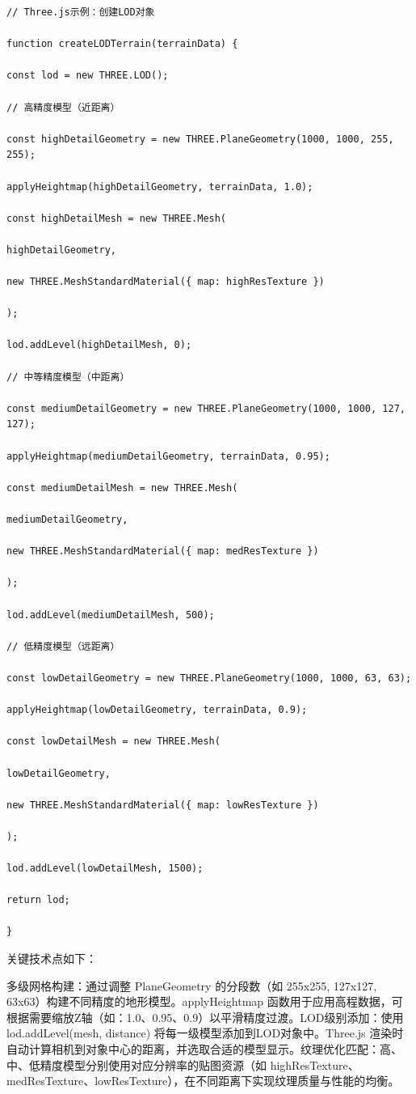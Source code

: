 \begin{lstlisting}[style=javascript]
// Three.js示例：创建LOD对象

function createLODTerrain(terrainData) {

const lod = new THREE.LOD();

// 高精度模型（近距离）

const highDetailGeometry = new THREE.PlaneGeometry(1000, 1000, 255, 255);

applyHeightmap(highDetailGeometry, terrainData, 1.0);

const highDetailMesh = new THREE.Mesh(

highDetailGeometry,

new THREE.MeshStandardMaterial({ map: highResTexture })

);

lod.addLevel(highDetailMesh, 0);

// 中等精度模型（中距离）

const mediumDetailGeometry = new THREE.PlaneGeometry(1000, 1000, 127, 127);

applyHeightmap(mediumDetailGeometry, terrainData, 0.95);

const mediumDetailMesh = new THREE.Mesh(

mediumDetailGeometry,

new THREE.MeshStandardMaterial({ map: medResTexture })

);

lod.addLevel(mediumDetailMesh, 500);

// 低精度模型（远距离）

const lowDetailGeometry = new THREE.PlaneGeometry(1000, 1000, 63, 63);

applyHeightmap(lowDetailGeometry, terrainData, 0.9);

const lowDetailMesh = new THREE.Mesh(

lowDetailGeometry,

new THREE.MeshStandardMaterial({ map: lowResTexture })

);

lod.addLevel(lowDetailMesh, 1500);

return lod;

}

\end{lstlisting}

关键技术点如下：

多级网格构建：通过调整 PlaneGeometry 的分段数（如 255x255, 127x127, 63x63）构建不同精度的地形模型。applyHeightmap 函数用于应用高程数据，可根据需要缩放Z轴（如：1.0、0.95、0.9）以平滑精度过渡。LOD级别添加：使用 lod.addLevel(mesh, distance) 将每一级模型添加到LOD对象中。Three.js 渲染时自动计算相机到对象中心的距离，并选取合适的模型显示。纹理优化匹配：高、中、低精度模型分别使用对应分辨率的贴图资源（如 highResTexture、medResTexture、lowResTexture），在不同距离下实现纹理质量与性能的均衡。

